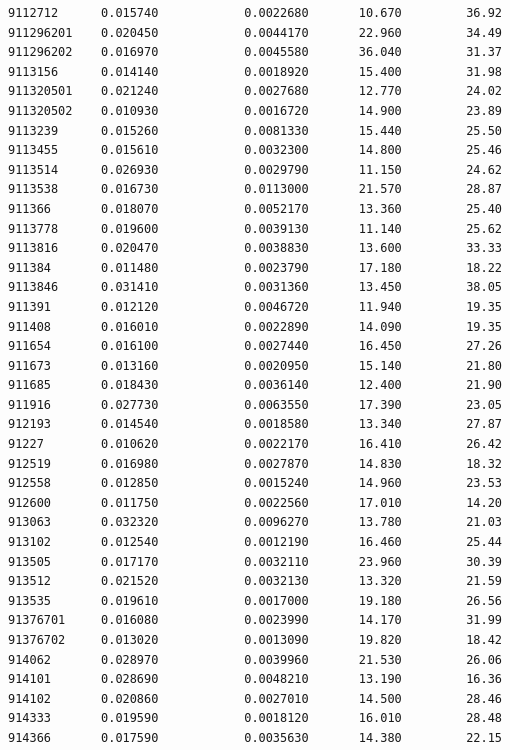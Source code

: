 \documentclass[
  letterpaper,
  DIV=11,
  numbers=noendperiod]{scrartcl}
\begin{document}
\begin{verbatim}
9112712      0.015740            0.0022680       10.670         36.92
911296201    0.020450            0.0044170       22.960         34.49
911296202    0.016970            0.0045580       36.040         31.37
9113156      0.014140            0.0018920       15.400         31.98
911320501    0.021240            0.0027680       12.770         24.02
911320502    0.010930            0.0016720       14.900         23.89
9113239      0.015260            0.0081330       15.440         25.50
9113455      0.015610            0.0032300       14.800         25.46
9113514      0.026930            0.0029790       11.150         24.62
9113538      0.016730            0.0113000       21.570         28.87
911366       0.018070            0.0052170       13.360         25.40
9113778      0.019600            0.0039130       11.140         25.62
9113816      0.020470            0.0038830       13.600         33.33
911384       0.011480            0.0023790       17.180         18.22
9113846      0.031410            0.0031360       13.450         38.05
911391       0.012120            0.0046720       11.940         19.35
911408       0.016010            0.0022890       14.090         19.35
911654       0.016100            0.0027440       16.450         27.26
911673       0.013160            0.0020950       15.140         21.80
911685       0.018430            0.0036140       12.400         21.90
911916       0.027730            0.0063550       17.390         23.05
912193       0.014540            0.0018580       13.340         27.87
91227        0.010620            0.0022170       16.410         26.42
912519       0.016980            0.0027870       14.830         18.32
912558       0.012850            0.0015240       14.960         23.53
912600       0.011750            0.0022560       17.010         14.20
913063       0.032320            0.0096270       13.780         21.03
913102       0.012540            0.0012190       16.460         25.44
913505       0.017170            0.0032110       23.960         30.39
913512       0.021520            0.0032130       13.320         21.59
913535       0.019610            0.0017000       19.180         26.56
91376701     0.016080            0.0023990       14.170         31.99
91376702     0.013020            0.0013090       19.820         18.42
914062       0.028970            0.0039960       21.530         26.06
914101       0.028690            0.0048210       13.190         16.36
914102       0.020860            0.0027010       14.500         28.46
914333       0.019590            0.0018120       16.010         28.48
914366       0.017590            0.0035630       14.380         22.15

\end{verbatim}
\end{document}
